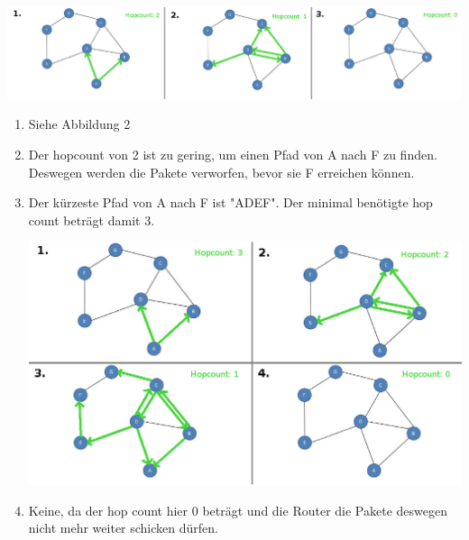 \documentclass[a4paper,
			llpt,
			solution,
			accentcolor=tud2d,
			colorbacktitle
			]
			{tudexercise}
\newcommand{\8}{$\infty$}
\begin{document}
\subsection{}
\begin{center}
\includegraphics[scale=1.2]{4_1_2.jpg}
\end{center}
\begin{enumerate}
\item Siehe Abbildung 2
\item Der hopcount von 2 ist zu gering, um einen Pfad von A nach F zu finden. Deswegen werden die Pakete verworfen, bevor sie F erreichen können.
\item Der kürzeste Pfad von A nach F ist "ADEF". Der minimal benötigte hop count beträgt damit 3.
\begin{center}
\includegraphics[scale=1.6]{4_1_2_d.jpg}
\end{center}
\item Keine, da der hop count hier 0 beträgt und die Router die Pakete deswegen nicht mehr weiter schicken dürfen.
\end{enumerate}
\end{document}
